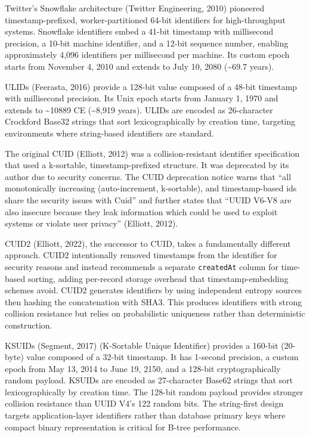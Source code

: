 \documentclass[fleqn,10pt,lineno]{wlpeerj}
\begin{document}
Twitter's Snowflake architecture (Twitter Engineering, 2010) pioneered
timestamp-prefixed, worker-partitioned 64-bit identifiers for
high-throughput systems. Snowflake identifiers embed a 41-bit timestamp
with millisecond precision, a 10-bit machine identifier, and a 12-bit
sequence number, enabling approximately 4,096 identifiers per
millisecond per machine. Its custom epoch starts from November 4, 2010
and extends to July 10, 2080 (\textasciitilde69.7 years).

ULIDs (Feerasta, 2016) provide a 128-bit value composed of a 48-bit
timestamp with millisecond precision. Its Unix epoch starts from January
1, 1970 and extends to \textasciitilde10889 CE (\textasciitilde8,919
years). ULIDs are encoded as 26-character Crockford Base32 strings that
sort lexicographically by creation time, targeting environments where
string-based identifiers are standard.

The original CUID (Elliott, 2012) was a collision-resistant identifier
specification that used a k-sortable, timestamp-prefixed structure. It
was deprecated by its author due to security concerns. The CUID
deprecation notice warns that ``all monotonically increasing
(auto-increment, k-sortable), and timestamp-based ids share the security
issues with Cuid'' and further states that ``UUID V6-V8 are also
insecure because they leak information which could be used to exploit
systems or violate user privacy'' (Elliott, 2012).

CUID2 (Elliott, 2022), the successor to CUID, takes a fundamentally
different approach. CUID2 intentionally removed timestamps from the
identifier for security reasons and instead recommends a separate
\texttt{createdAt} column for time-based sorting, adding per-record
storage overhead that timestamp-embedding schemes avoid. CUID2 generates
identifiers by using independent entropy sources then hashing the
concatenation with SHA3. This produces identifiers with strong collision
resistance but relies on probabilistic uniqueness rather than
deterministic construction.

KSUIDs (Segment, 2017) (K-Sortable Unique Identifier) provides a 160-bit
(20-byte) value composed of a 32-bit timestamp. It has 1-second
precision, a custom epoch from May 13, 2014 to June 19, 2150, and a
128-bit cryptographically random payload. KSUIDs are encoded as
27-character Base62 strings that sort lexicographically by creation
time. The 128-bit random payload provides stronger collision resistance
than UUID V4's 122 random bits. The string-first design targets
application-layer identifiers rather than database primary keys where
compact binary representation is critical for B-tree performance.
\end{document}
